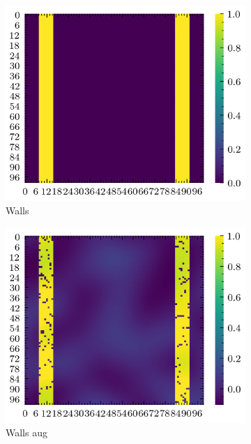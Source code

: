 \documentclass[../document.tex]{subfiles}
\begin{document}
\begin{figure}[H]
    \centering
        \begin{subfigure}[b]{0.45\textwidth}
            \includegraphics[width=\textwidth]{../img/data-aug/2d/wall.png}
            \caption{Walls}
        \end{subfigure}
        \begin{subfigure}[b]{0.45\linewidth}
            \includegraphics[width=\textwidth]{../img/data-aug/2d/wall-aug.png}
            \caption{Walls aug}
        \end{subfigure}    
        \begin{subfigure}[b]{0.45\textwidth}

\end{subfigure}
\end{figure}
\end{document}
